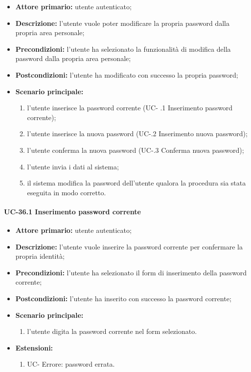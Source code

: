 	\begin{itemize}
		\item \textbf{Attore primario:} utente autenticato;

		\item \textbf{Descrizione:}  l'utente vuole poter modificare la propria password dalla propria area personale;

		\item \textbf{Precondizioni:} l'utente ha selezionato la funzionalità di modifica della password dalla propria area personale;

		\item \textbf{Postcondizioni:} l'utente ha modificato con successo la propria password;

		\item \textbf{Scenario principale:}
	  		\begin{enumerate}
		  		\item l'utente inserisce la password corrente (UC- .1 Inserimento password corrente);
		  		\item l'utente inserisce la nuova password (UC-.2 Inserimento nuova password);
		  		\item l'utente conferma la nuova password (UC-.3 Conferma nuova password);
		  		\item l'utente invia i dati al sistema;
		  		\item il sistema modifica la password dell'utente qualora la procedura sia stata eseguita in modo corretto.
	  		\end{enumerate}
	\end{itemize}

\paragraph{UC-36.1 Inserimento password corrente}

	\begin{itemize}
		\item \textbf{Attore primario:} utente autenticato;

		\item \textbf{Descrizione:} l'utente vuole inserire la password corrente per confermare la propria identità;

		\item \textbf{Precondizioni:} l'utente ha selezionato il form di inserimento della password corrente;

		\item \textbf{Postcondizioni:} l'utente ha inserito con successo la password corrente;

		\item \textbf{Scenario principale:}
	  		\begin{enumerate}
		  		\item l'utente digita la password corrente nel form selezionato.
	  		\end{enumerate}
		\item \textbf{Estensioni:}
			\begin{enumerate}
		  		\item UC- Errore: password errata.
	  		\end{enumerate}
	\end{itemize}

